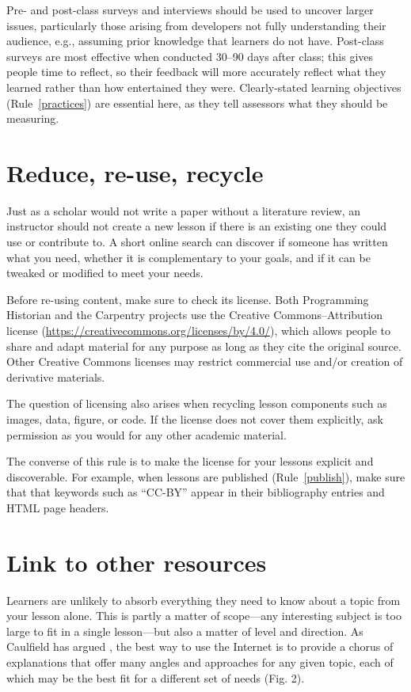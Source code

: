 \documentclass[10pt,letterpaper]{article}
\newcommand{\rulemajor}[2]{\section{#1}\label{#2}}
\newcommand{\ruleref}[1]{Rule~\ref{#1}}
\begin{document}
Pre- and post-class surveys and interviews should be used to uncover larger issues,
particularly those arising from developers not fully understanding their audience,
e.g.,
assuming prior knowledge that learners do not have.
Post-class surveys are most effective when conducted 30--90 days after class;
this gives people time to reflect,
so their feedback will more accurately reflect what they learned
rather than how entertained they were.
Clearly-stated learning objectives (\ruleref{practices}) are essential here,
as they tell assessors what they should be measuring.

\rulemajor{Reduce, re-use, recycle}{rrr}

Just as a scholar would not write a paper without a literature review,
an instructor should not create a new lesson if there is an existing one they could use or contribute to.
A short online search can discover if someone has written what you need,
whether it is complementary to your goals,
and if it can be tweaked or modified to meet your needs.

Before re-using content,
make sure to check its license.
Both Programming Historian and the Carpentry projects
use the Creative Commons--Attribution license
(\url{https://creativecommons.org/licenses/by/4.0/}),
which allows people to share and adapt material for any purpose
as long as they cite the original source.
Other Creative Commons licenses may restrict commercial use
and/or creation of derivative materials.

The question of licensing also arises when recycling lesson components
such as images, data, figure, or code.
If the license does not cover them explicitly,
ask permission as you would for any other academic material.

The converse of this rule is to make the license for your lessons explicit and discoverable.
For example,
when lessons are published (\ruleref{publish}),
make sure that that keywords such as ``CC-BY'' appear in their bibliography entries
and HTML page headers.

\rulemajor{Link to other resources}{link}

Learners are unlikely to absorb everything they need to know about a topic from your lesson alone.
This is partly a matter of scope---any interesting subject is too large
to fit in a single lesson---but also a matter of level and direction.
As Caulfield has argued \cite{choral-explanations},
the best way to use the Internet is to provide a chorus of explanations
that offer many angles and approaches for any given topic,
each of which may be the best fit for a different set of needs (Fig. 2).
\end{document}
